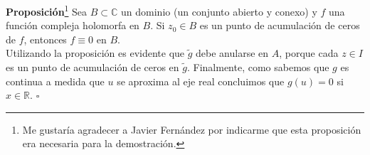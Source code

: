 \textbf{Proposición}\footnote{Me gustaría agradecer a Javier Fernández por indicarme que esta proposición era necesaria para la demostración.} Sea $B\subset \mathbb{C}$ un dominio (un conjunto abierto y conexo) y $f$ una función  compleja holomorfa en $B$. Si $z_0\in B$ es un punto de acumulación de ceros de $f$, entonces $f \equiv 0$ en $B$.\\

Utilizando la proposición es evidente que $\tilde{g}$ debe anularse en $A$, porque cada $z\in I$ es un punto de acumulación de ceros en $\tilde{g}$. Finalmente, como sabemos que $g$ es continua a medida que $u$ se aproxima al eje real concluimos que $g(u)=0$ si $x\in \mathbb{R}$. $\square$


